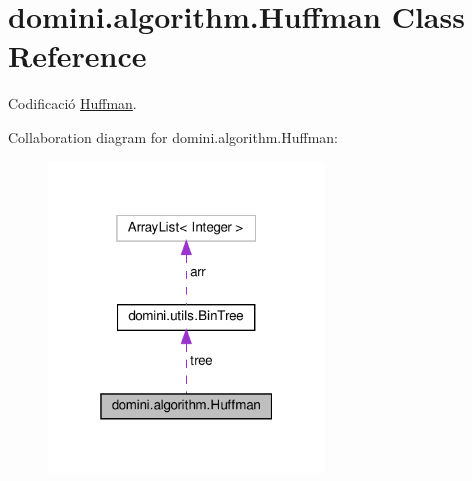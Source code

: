 \hypertarget{classdomini_1_1algorithm_1_1Huffman}{}\section{domini.\+algorithm.\+Huffman Class Reference}
\label{classdomini_1_1algorithm_1_1Huffman}


Codificació \hyperlink{classdomini_1_1algorithm_1_1Huffman}{Huffman}.  




Collaboration diagram for domini.\+algorithm.\+Huffman\+:\nopagebreak
\begin{figure}[H]
\begin{center}
\leavevmode
\includegraphics[width=208pt]{classdomini_1_1algorithm_1_1Huffman__coll__graph}
\end{center}
\end{figure}
